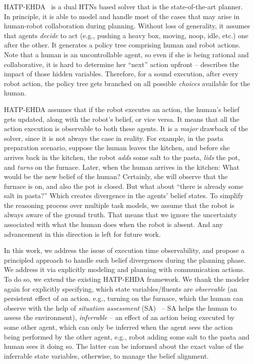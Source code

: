 \documentclass[letterpaper]{article} %
\begin{document}
HATP-EHDA~\cite{buisan:hal-03684211} is a dual HTNs based solver that is the state-of-the-art planner. In principle, it is able to model and handle most of the cases that may arise in human-robot collaboration during planning. Without loss of generality, it assumes that agents \textit{decide} to act (e.g., pushing a heavy box, moving, noop, idle, etc.) one after the other. 
It generates a policy tree comprising human and robot actions. Note that a human is an uncontrollable agent, so even if she is being rational and collaborative, it is hard to determine her ``next'' action upfront -- describes the impact of those hidden variables.
Therefore, for a sound execution, after every robot action, the policy tree gets branched on all possible \textit{choices} available for the human.

HATP-EHDA assumes that if the robot executes an action, the human's belief gets updated, along with the robot's belief, or vice versa. It means that all the action execution is observable to both these agents. It is a \textit{major} drawback of the solver, since it is not always the case in reality. For example, in the pasta preparation scenario, suppose the human leaves the kitchen, and before she arrives back in the kitchen, the robot \textit{adds} some salt to the pasta, \textit{lids} the pot, and \textit{turns} on the furnace. 
Later, when the human arrives in the kitchen: What would be the new belief of the human? Certainly, she will observe that the furnace is {\sc on}, and also the pot is closed. But what about ``there is already some salt in pasta?'' Which creates divergence in the agents' belief states. 
To simplify the reasoning process over multiple task models, we assume that the robot is always aware of the ground truth. That means that we ignore the uncertainty associated with what the human does when the robot is absent. 
And any advancement in this direction is left for future work. 


In this work, we address the issue of execution time observability, and propose a principled approach to handle such belief divergences during the planning phase. 
We address it via explicitly modeling and planning with communication actions. 
To do so, we extend the existing HATP-EHDA framework. We thank the modeler again for explicitly specifying, which state variables/fluents are \textit{observable} (an persistent effect of an action, e.g., turning on the furnace, which the human can observe with the help of \textit{situation assessment} (SA)~\cite{cite?} -- SA helps the human to assess the environment), \textit{inferrable} -- an effect of an action being executed by some other agent, which can only be inferred when the agent sees the action being performed by the other agent, e.g., robot adding some salt to the pasta and human sees it doing so. 
The latter can be informed about the exact value of the inferrable state variables, otherwise, to manage the belief alignment.   
\end{document}

